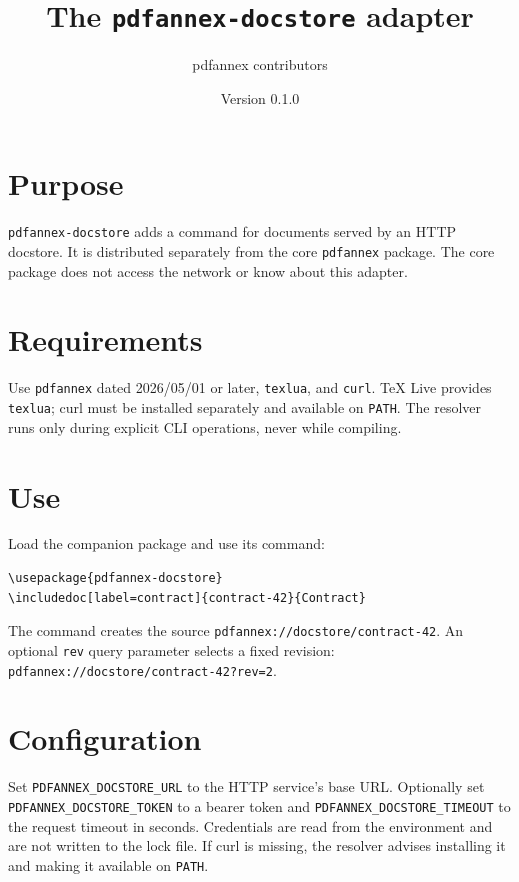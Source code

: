 \documentclass{article}
\title{The \texttt{pdfannex-docstore} adapter}
\author{pdfannex contributors}
\date{Version 0.1.0}
\begin{document}
\maketitle

\section{Purpose}

\texttt{pdfannex-docstore} adds a command for documents served by an HTTP
docstore. It is distributed separately from the core \texttt{pdfannex}
package. The core package does not access the network or know about this
adapter.

\section{Requirements}

Use \texttt{pdfannex} dated 2026/05/01 or later, \texttt{texlua}, and
\texttt{curl}. TeX Live provides \texttt{texlua}; curl must be installed
separately and available on \texttt{PATH}. The resolver runs only during
explicit CLI operations, never while compiling.

\section{Use}

Load the companion package and use its command:

\begin{verbatim}
\usepackage{pdfannex-docstore}
\includedoc[label=contract]{contract-42}{Contract}
\end{verbatim}

The command creates the source
\texttt{pdfannex://docstore/contract-42}. An optional \texttt{rev} query
parameter selects a fixed revision:
\texttt{pdfannex://docstore/contract-42?rev=2}.

\section{Configuration}

Set \texttt{PDFANNEX\_DOCSTORE\_URL} to the HTTP service's base URL.
Optionally set \texttt{PDFANNEX\_DOCSTORE\_TOKEN} to a bearer token and
\texttt{PDFANNEX\_DOCSTORE\_TIMEOUT} to the request timeout in seconds.
Credentials are read from the environment and are not written to the lock
file. If curl is missing, the resolver advises installing it and making it
available on \texttt{PATH}.
\end{document}
